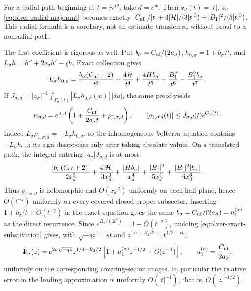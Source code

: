 \documentclass[11pt]{article}
\theoremstyle{remark}
\begin{document}
For a radial path beginning at \(t=re^{i\theta}\), take
\(d=e^{i\theta}\).  Then \(x_d(t)=|t|\), so
\eqref{eq:olver-radial-majorant} becomes exactly
\(|C_{\rm nf}|/|t|+4|\mathcal{H}|/(3|t|^3)+|B_1|^2/(5|t|^5)\).  This radial formula is a
corollary, not an estimate transferred without proof to a nonradial path.

The first coefficient is rigorous as well.  Put
\(b_\sigma=C_{\rm nf}/(2a_\sigma)\), \(h_{0,\sigma}=1+b_\sigma/t\), and
\(L_\sigma h=h''+2a_\sigma h'-gh\).  Exact collection gives
\begin{equation}
 L_\sigma h_{0,\sigma}=
 \frac{b_\sigma(C_{\rm nf}+2)}{t^3}+\frac{4\mathcal{H}}{t^4}
 +\frac{4Hb_\sigma}{t^5}-\frac{B_1^2}{t^6}
 -\frac{B_1^2b_\sigma}{t^7}.
 \label{eq:olver-one-term-residual}
\end{equation}
If
\(J_{\sigma,d}=|a_\sigma|^{-1}\int_{\Gamma_d(t)}
|L_\sigma h_{0,\sigma}(u)|\,|du|\), the same proof yields
\begin{equation}
 w_{\sigma,d}=e^{a_\sigma t}
 \left(1+\frac{C_{\rm nf}}{2a_\sigma t}+\rho_{1,\sigma,d}\right),\qquad
 |\rho_{1,\sigma,d}(t)|\leq J_{\sigma,d}(t)e^{G_d(t)}.
 \label{eq:olver-one-term-bound}
\end{equation}
Indeed \(L_\sigma\rho_{1,\sigma,d}=-L_\sigma h_{0,\sigma}\), so the
inhomogeneous Volterra equation contains \(-L_\sigma h_{0,\sigma}\); its
sign disappears only after taking absolute values.  On a translated path,
the integral entering \(|a_\sigma|J_{\sigma,d}\) is at most
\begin{equation}
 \frac{|b_\sigma(C_{\rm nf}+2)|}{2x_d^2}+\frac{4|\mathcal{H}|}{3x_d^3}
 +\frac{|Hb_\sigma|}{x_d^4}+\frac{|B_1|^2}{5x_d^5}
 +\frac{|B_1|^2|b_\sigma|}{6x_d^6}.
 \label{eq:olver-one-term-majorant}
\end{equation}
Thus \(\rho_{1,\sigma,d}\) is holomorphic and \(O(x_d^{-2})\) uniformly on
each half-plane, hence \(O(t^{-2})\) uniformly on every covered closed proper
subsector.  Inserting
\(1+b_\sigma/t+O(t^{-2})\) in the exact equation gives the same
\(b_\sigma=C_{\rm nf}/(2a_\sigma)=u_1^{(\sigma)}\) as the direct recurrence.
Since \(e^{B_1/(2t^2)}=1+O(t^{-2})\), undoing
\eqref{eq:olver-exact-substitution} gives, with
\(\sqrt{-qz}=st\) and \(z^{1/4-B_2/2}=t^{1/2-B_2}\),
\begin{equation}
 \Psi_\sigma(z)=e^{2\sigma\sqrt{-qz}}z^{1/4-B_2/2}
 \left[1+u_1^{(\sigma)}z^{-1/2}+O(z^{-1})\right],\qquad
 u_1^{(\sigma)}=\frac{C_{\rm nf}}{2a_\sigma},
 \label{eq:olver-z-result}
\end{equation}
uniformly on the corresponding covering-sector images.  In particular the
relative error in the leading approximation is uniformly \(O(|t|^{-1})\),
that is, \(O(|z|^{-1/2})\).
\end{document}
